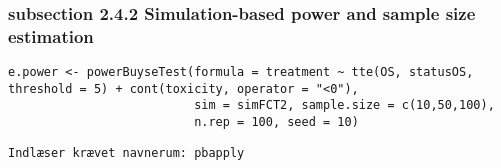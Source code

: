 \documentclass[12pt]{article}
\begin{document}
\subsubsection{subsection 2.4.2 Simulation-based power and sample size estimation}
\label{sec:org6654a3d}

\lstset{language=r,label= ,caption= ,captionpos=b,numbers=none}
\begin{lstlisting}
e.power <- powerBuyseTest(formula = treatment ~ tte(OS, statusOS, threshold = 5) + cont(toxicity, operator = "<0"),
                          sim = simFCT2, sample.size = c(10,50,100),
                          n.rep = 100, seed = 10)
\end{lstlisting}

\begin{verbatim}
Indlæser krævet navnerum: pbapply


\end{verbatim}
\end{document}
